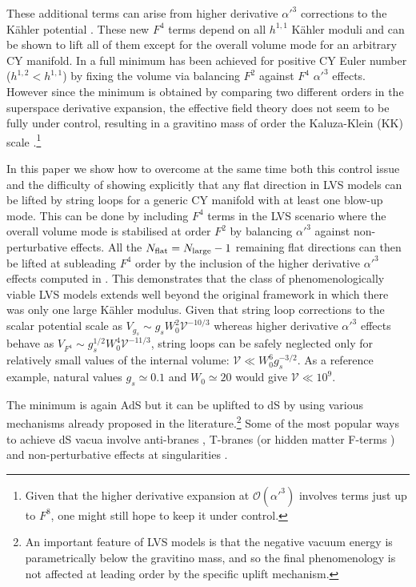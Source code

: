 \documentclass[11pt,a4paper]{article}
\newcommand\vo{{\mathcal{V}}}
\newcommand{\mc}{\mathcal}
\begin{document}
These additional terms can arise from higher derivative $\alpha'^3$ corrections to the K\"ahler potential \cite{Ciupke:2015msa}. These new $F^4$ terms depend on all $h^{1,1}$ K\"ahler moduli and can be shown to lift all of them except for the overall volume mode for an arbitrary CY manifold. In \cite{Ciupke:2015msa} a full minimum has been achieved for positive CY Euler number ($h^{1,2}< h^{1,1}$) by fixing the volume via balancing $F^2$ against $F^4$ $\alpha'^3$ effects. However since the minimum is obtained by comparing two different orders in the superspace derivative expansion, the effective field theory does not seem to be fully under control, resulting in a gravitino mass of order the Kaluza-Klein (KK) scale \cite{Cicoli:2013swa}.\footnote{Given that the higher derivative expansion at $\mc{O}(\alpha'^3)$ involves terms just up to $F^8$, one might still hope to keep it under control.} 

In this paper we show how to overcome at the same time both this control issue and the difficulty of showing explicitly that any flat direction in LVS models can be lifted by string loops for a generic CY manifold with at least one blow-up mode. This can be done by including $F^4$ terms in the LVS scenario where the overall volume mode is stabilised at order $F^2$ by balancing $\alpha'^3$ against non-perturbative effects. All the $N_{\rm flat}= N_{\rm large}-1$ remaining flat directions can then be lifted at subleading $F^4$ order by the inclusion of the higher derivative $\alpha'^3$ effects computed in \cite{Ciupke:2015msa}. This demonstrates that the class of phenomenologically viable LVS models extends well beyond the original framework in which there was only one large K\"ahler modulus. Given that string loop corrections to the scalar potential scale as $V_{g_s}\sim g_s W_0^2 \vo^{-10/3}$ whereas higher derivative $\alpha'^3$ effects behave as $V_{F^4}\sim g_s^{1/2} W_0^4 \vo^{-11/3}$, string loops can be safely neglected only for relatively small values of the internal volume: $\vo \ll W_0^6 g_s^{-3/2}$. As a reference example, natural values $g_s\simeq 0.1$ and $W_0\simeq 20$ would give $\vo\ll 10^9$. 

The minimum is again AdS but it can be uplifted to dS by using various mechanisms already proposed in the literature.\footnote{An important feature of LVS models is that the negative vacuum energy is parametrically below the gravitino mass, and so the final phenomenology is not affected at leading order by the specific uplift mechanism.} Some of the most popular ways to achieve dS vacua involve anti-branes \cite{Kachru:2003aw, deAlwis:2016cty}, T-branes \cite{Cicoli:2015ylx} (or hidden matter F-terms \cite{CYembedding}) and non-perturbative effects at singularities \cite{Cicoli:2012fh}.
\end{document}
